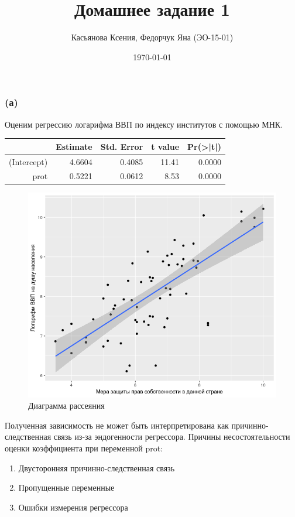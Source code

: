 \documentclass[a4paper,12pt]{article} %
\author{Касьянова Ксения, Федорчук Яна (ЭО-15-01) }
\title{Домашнее задание 1}
\date{\today}
\begin{document}
\maketitle

\subsubsection*{(а)}	
	
Оценим регрессию логарифма ВВП по индексу институтов с помощью МНК.
	
	
\begin{table}[h!]
	\centering
	\begin{tabular}{rrrrr}
		\hline
		& Estimate & Std. Error & t value & Pr(>|t|) \\ 
		\hline
		(Intercept) & 4.6604 & 0.4085 & 11.41 & 0.0000 \\ 
		prot & 0.5221 & 0.0612 & 8.53 & 0.0000 \\ 
		\hline
	\end{tabular}
\end{table}	
	
\begin{figure}[h!]
	\centering
	\includegraphics[width=0.7\linewidth]{Rplot1}
	\caption[Диаграмма рассеяния]{Диаграмма рассеяния}
	\label{fig:rplot1}
\end{figure}



Полученная зависимость не может быть интерпретирована как
причинно-следственная связь из-за  эндогенности  регрессора. 
Причины несостоятельности оценки коэффициента при переменной prot:
\begin{enumerate}
	\item Двусторонняя причинно-следственная связь
\item Пропущенные переменные
\item Ошибки измерения регрессора
\end{enumerate}	
	
\end{document}
